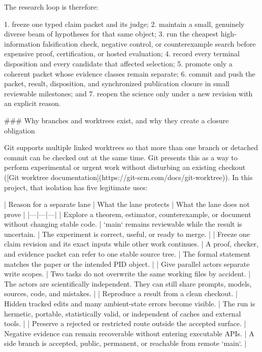 \documentclass[11pt]{article}
\begin{document}
\begin{markdown}
The research loop is therefore:

1. freeze one typed claim packet and its judge;
2. maintain a small, genuinely diverse beam of hypotheses for that same object;
3. run the cheapest high-information falsification check, negative control, or counterexample search
   before expensive proof, certification, or hosted evaluation;
4. record every terminal disposition and every candidate that affected selection;
5. promote only a coherent packet whose evidence classes remain separate;
6. commit and push the packet, result, disposition, and synchronized publication closure in small
   reviewable milestones; and
7. reopen the science only under a new revision with an explicit reason.

### Why branches and worktrees exist, and why they create a closure obligation

Git supports multiple linked worktrees so that more than one branch or detached commit can be
checked out at the same time. Git presents this as a way to perform experimental or urgent work
without disturbing an existing checkout ([Git worktree documentation](https://git-scm.com/docs/git-worktree)).
In this project, that isolation has five legitimate uses:

| Reason for a separate lane | What the lane protects | What the lane does not prove |
|---|---|---|
| Explore a theorem, estimator, counterexample, or document without changing stable code. | `main` remains reviewable while the result is uncertain. | The experiment is correct, useful, or ready to merge. |
| Freeze one claim revision and its exact inputs while other work continues. | A proof, checker, and evidence packet can refer to one stable source tree. | The formal statement matches the paper or the intended PID object. |
| Give parallel actors separate write scopes. | Two tasks do not overwrite the same working files by accident. | The actors are scientifically independent. They can still share prompts, models, sources, code, and mistakes. |
| Reproduce a result from a clean checkout. | Hidden tracked edits and many ambient-state errors become visible. | The run is hermetic, portable, statistically valid, or independent of caches and external tools. |
| Preserve a rejected or restricted route outside the accepted surface. | Negative evidence can remain recoverable without entering executable APIs. | A side branch is accepted, public, permanent, or reachable from remote `main`. |


\end{markdown}
\end{document}
